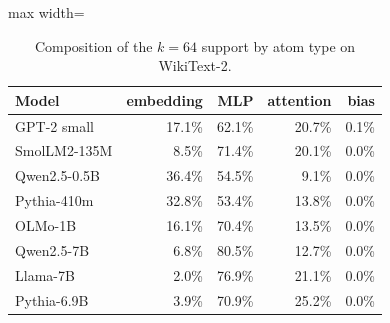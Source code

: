 \begin{table}[H]\centering\scriptsize
\caption{Composition of the $k=64$ support by atom type on WikiText-2.}\label{app:z3-support}
\begin{adjustbox}{max width=\linewidth}
\begin{tabular}{lrrrr}\toprule
Model & embedding & MLP & attention & bias \\ \midrule
GPT-2 small & 17.1\% & 62.1\% & 20.7\% & 0.1\% \\
SmolLM2-135M & 8.5\% & 71.4\% & 20.1\% & 0.0\% \\
Qwen2.5-0.5B & 36.4\% & 54.5\% & 9.1\% & 0.0\% \\
Pythia-410m & 32.8\% & 53.4\% & 13.8\% & 0.0\% \\
OLMo-1B & 16.1\% & 70.4\% & 13.5\% & 0.0\% \\
Qwen2.5-7B & 6.8\% & 80.5\% & 12.7\% & 0.0\% \\
Llama-7B & 2.0\% & 76.9\% & 21.1\% & 0.0\% \\
Pythia-6.9B & 3.9\% & 70.9\% & 25.2\% & 0.0\% \\
\bottomrule\end{tabular}\end{adjustbox}
\end{table}
